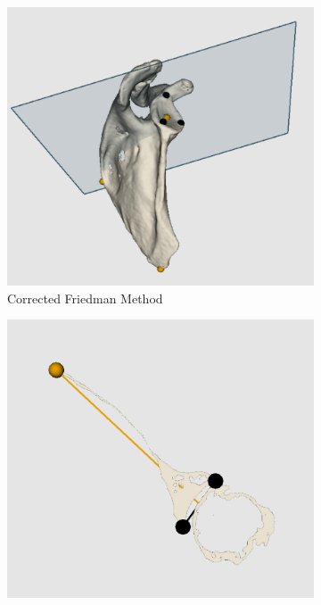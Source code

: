 \begin{figure}
\begin{center}
	\end{center}
	    \begin{center}
                \begin{subfigure}[b]{0.30\linewidth}
			\includegraphics[width=\linewidth]{figures/corr_fried_vis.png}
			\caption{\label{fig:viscorrfried}Corrected Friedman Method}
		\end{subfigure}	
                \begin{subfigure}[b]{0.30\linewidth}
			\includegraphics[width=\linewidth]{figures/friedman_vis2D.png}

\end{subfigure}
\end{center}
\end{figure}
